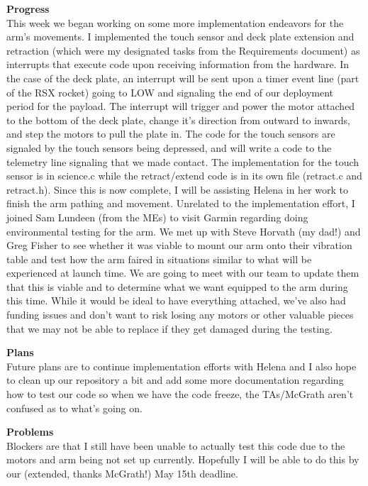\textbf{Progress} \\ 
This week we began working on some more implementation endeavors for the arm's movements. I implemented the touch sensor and deck plate extension and 
retraction (which were my designated tasks from the Requirements document) as interrupts that execute code upon receiving information from the hardware. 
In the case of the deck plate, an interrupt will be sent upon a timer event line (part of the RSX rocket) going to LOW and signaling the end of our 
deployment period for the payload. The interrupt will trigger and power the motor attached to the bottom of the deck plate, change it's direction from 
outward to inwards, and step the motors to pull the plate in. The code for the touch sensors are signaled by the touch sensors being depressed, and will 
write a code to the telemetry line signaling that we made contact. The implementation for the touch sensor is in science.c while the retract/extend code 
is in its own file (retract.c and retract.h). Since this is now complete, I will be assisting Helena in her work to finish the arm pathing and movement. 
Unrelated to the implementation effort, I joined Sam Lundeen (from the MEs) to visit Garmin regarding doing environmental testing for the arm. We met up 
with Steve Horvath (my dad!) and Greg Fisher to see whether it was viable to mount our arm onto their vibration table and test how the arm faired in 
situations similar to what will be experienced at launch time. We are going to meet with our team to update them that this is viable and to determine 
what we want equipped to the arm during this time. While it would be ideal to have everything attached, we've also had funding issues and don't want to 
risk losing any motors or other valuable pieces that we may not be able to replace if they get damaged during the testing.

\textbf{Plans} \\ 
Future plans are to continue implementation efforts with Helena and I also hope to clean up our repository a bit and add some more documentation 
regarding how to test our code so when we have the code freeze, the TAs/McGrath aren't confused as to what's going on.

\textbf{Problems} \\ 
Blockers are that I still have been unable to actually test this code due to the motors and arm being not set up currently. Hopefully I will be able to 
do this by our (extended, thanks McGrath!) May 15th deadline.

